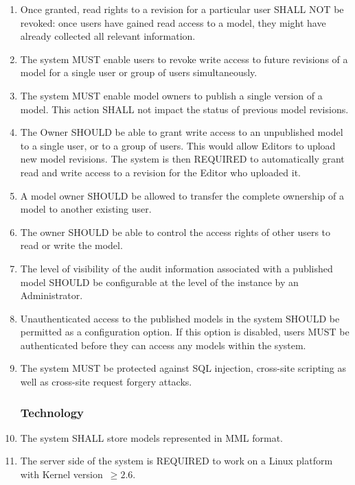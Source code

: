 \begin{enumerate}[1]
\item Once granted, read rights to a revision for a particular user SHALL NOT be revoked: once users have gained read access to a model, they might have already collected all relevant information.

\item The system MUST enable users to revoke write access to future revisions of a model for a single user or group of users simultaneously.

\item The system MUST enable model owners to publish a single version of a model. This action SHALL not impact the status of previous model revisions. 

\item The Owner SHOULD be able to grant write access to an unpublished model to a single user, or to a group of users. This would allow Editors to upload new model revisions. The system is then REQUIRED to automatically grant read and write access to a revision for the Editor who uploaded it.

\item A model owner SHOULD be allowed to transfer the complete ownership of a model to another existing user.

\item The owner SHOULD be able to control the access rights of other users to read or write the model.

\item The level of visibility of the audit information associated with a published model SHOULD be configurable at the level of the instance by an Administrator.

\item Unauthenticated access to the published models in the system SHOULD be permitted as a configuration option. If this option is disabled, users MUST be authenticated before they can access any models within the system.

\item The system MUST be protected against SQL injection, cross-site scripting as well as cross-site request forgery attacks. 

\subsubsection{Technology}
\item The system SHALL store models represented in MML format.

\item The server side of the system is REQUIRED to work on a Linux platform with Kernel version~$\ge 2.6$. 


\end{enumerate}
